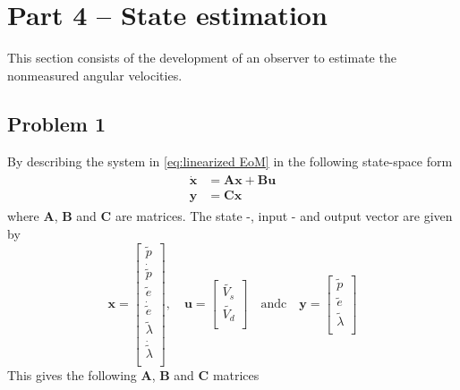 \section{Part 4 -- State estimation}
This section consists of the development of an observer to estimate the
nonmeasured angular velocities.
%
\subsection{Problem 1}
By describing the system in \cref{eq:linearized EoM} in the following
state-space form
%
\begin{align}
  \begin{split}
    \dot{\bm{x}} &= \bm{Ax} + \bm{Bu} \\
    \bm{y} &= \bm{Cx}
  \end{split}
\end{align}
%
where  $\bm{A}$, $\bm{B}$ and $\bm{C}$ are matrices. The state -,
input - and output vector are given by
%
\begin{equation}
  \label{eq:state_space_vectors}
  \bm{x} =
  \begin{bmatrix}
    \tilde{p} \\
    \dot{\tilde{p}} \\
    \tilde{e} \\
    \dot{\tilde{e}} \\
    \tilde{\lambda} \\
    \dot{\tilde{\lambda}} \\
  \end{bmatrix}
  , \quad \bm{u} =
  \begin{bmatrix}
    \tilde{V_s} \\
    \tilde{V_d} \\
  \end{bmatrix}
  \quad \text{andc} \quad \bm{y} =
  \begin{bmatrix}
    \tilde{p} \\
    \tilde{e} \\
    \tilde{\lambda}\\
  \end{bmatrix}
\end{equation}
%
This gives the following $\bm{A}$, $\bm{B}$ and $\bm{C}$ matrices
%
